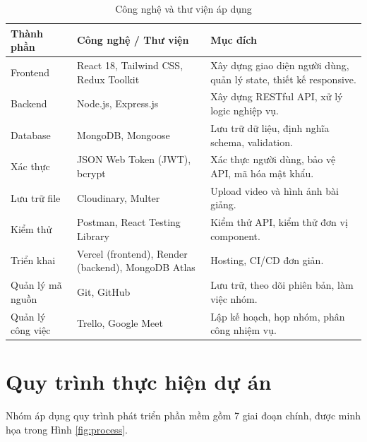 \begin{table}[H]
\centering
\caption{Công nghệ và thư viện áp dụng}
\label{tab:tech}
\begin{tabular}{|p{3cm}|p{4cm}|p{7cm}|}
\hline
\textbf{Thành phần} & \textbf{Công nghệ / Thư viện} & \textbf{Mục đích} \\ \hline
Frontend & React 18, Tailwind CSS, Redux Toolkit & Xây dựng giao diện người dùng, quản lý state, thiết kế responsive. \\ \hline
Backend & Node.js, Express.js & Xây dựng RESTful API, xử lý logic nghiệp vụ. \\ \hline
Database & MongoDB, Mongoose & Lưu trữ dữ liệu, định nghĩa schema, validation. \\ \hline
Xác thực & JSON Web Token (JWT), bcrypt & Xác thực người dùng, bảo vệ API, mã hóa mật khẩu. \\ \hline
Lưu trữ file & Cloudinary, Multer & Upload video và hình ảnh bài giảng. \\ \hline
Kiểm thử & Postman, React Testing Library & Kiểm thử API, kiểm thử đơn vị component. \\ \hline
Triển khai & Vercel (frontend), Render (backend), MongoDB Atlas & Hosting, CI/CD đơn giản. \\ \hline
Quản lý mã nguồn & Git, GitHub & Lưu trữ, theo dõi phiên bản, làm việc nhóm. \\ \hline
Quản lý công việc & Trello, Google Meet & Lập kế hoạch, họp nhóm, phân công nhiệm vụ. \\ \hline
\end{tabular}
\end{table}

\section{Quy trình thực hiện dự án}
Nhóm áp dụng quy trình phát triển phần mềm gồm 7 giai đoạn chính, được minh họa trong Hình \ref{fig:process}.


